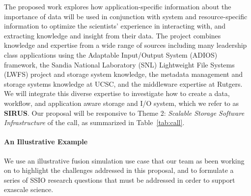The proposed work explores how application-specific information about the
importance of data will be used in conjunction with system and
resource-specific information to optimize the scientists' experience in
interacting with, and extracting knowledge and insight from their data.
%
The project combines knowledge and expertise 
from a wide range of sources including many leadership class applications using the Adaptable Input/Output System (ADIOS) framework,
the Sandia National Laboratory (SNL) Lightweight File Systems (LWFS) project and storage system knowledge, the metadata
management and storage systems knowledge at UCSC, and the middleware expertise
at Rutgers. We will integrate this diverse expertise to investigate how to create
a data, workflow, and application aware storage and I/O system, which we refer to as
{\bf SIRUS}.
%
Our proposal will be responsive to Theme 2: {\em Scalable Storage Software Infrastructure} of the call, as summarized in Table~\ref{tab:call}.

%
\paragraph{An Illustrative Example}
We use an illustrative fusion simulation use case that our team as been working on to highlight the challenges addressed in this proposal, and to 
formulate a series of SSIO research questions that must be addressed in order to support exascale science.

